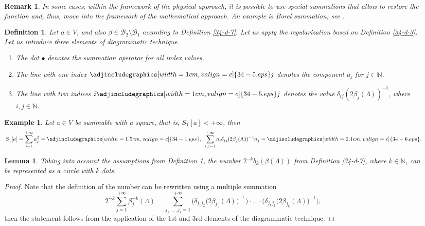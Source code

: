 \documentclass[a4paper]{article}
\newtheorem{lemma}{Lemma}
\newtheorem{deff}{Definition}
\newtheorem{remark}{Remark}
\newtheorem{exm}{Example}
\begin{document}
\begin{remark}\label{34-r-7} In some cases, within the framework of the physical approach, it is possible to use special summations that allow to restore the function and, thus, move into the framework of the mathematical approach. An example is Borel summation, see \cite{34-ha,34-hb}.
\end{remark}



\begin{deff}\label{34-d-9} Let $a\in V$, and also $\beta\in\mathcal{B}_2\setminus\mathcal{B}_1$ according to Definition \ref{34-d-7}. Let us apply the regularization based on Definition \ref{34-d-3}. Let us introduce three elements of diagrammatic technique.
\begin{enumerate}
	\item The dot $\bullet$ denotes the summation operator for all index values.
	\item The line with one index ${\centering\adjincludegraphics[width = 1 cm, valign=c]{34-5.eps}}j$
	denotes the component $a_j$ for $j\in\mathbb{N}$.
	\item The line with two indices $i{\centering\adjincludegraphics[width = 1 cm, valign=c]{34-5.eps}}j$ denotes the value $\delta_{ij}(2\beta_j(\Lambda))^{-1}$, where $i,j\in\mathbb{N}$.
\end{enumerate}
\end{deff}
\begin{exm}\label{34-e-2} Let $a\in V$ be summable with a square, that is, $S_1[a]<+\infty$, then
\begin{equation}\label{34-f-1}
	S_1[a]=\sum_{j=1}^{+\infty}a_j^2=
	{\centering\adjincludegraphics[width = 1.5 cm, valign=c]{34-1.eps}},\,\,\,
	\sum_{i,j=1}^{+\infty}a_i\delta_{ij}(2\beta_j(\Lambda))^{-1}a_j=
	{\centering\adjincludegraphics[width = 2.1 cm, valign=c]{34-6.eps}}.
\end{equation}
\end{exm}
\begin{lemma}\label{34-l-5}
Taking into account the assumptions from Definition \ref{34-d-9}, the number $2^{-k}b_k(\beta(\Lambda))$ from Definition \ref{34-d-7}, where $k\in\mathbb{N}$, can be represented as a circle with $k$ dots.
\end{lemma}
\begin{proof} Note that the definition of the number can be rewritten using a multiple summation
\begin{equation}\label{34-f-8}
2^{-k}\sum_{j=1}^{+\infty}\beta_j^{-k}(\Lambda)=
\sum_{j_1,\ldots,j_k=1}^{+\infty}
\Big(\delta_{j_1j_2}\big(2\beta_{j_1}(\Lambda)\big)^{-1}\Big)\cdot\ldots\cdot
\Big(\delta_{j_kj_1}\big(2\beta_{j_k}(\Lambda)\big)^{-1}\Big),
\end{equation}
then the statement follows from the application of the 1st and 3rd elements of the diagrammatic technique.
\end{proof}
\end{document}
